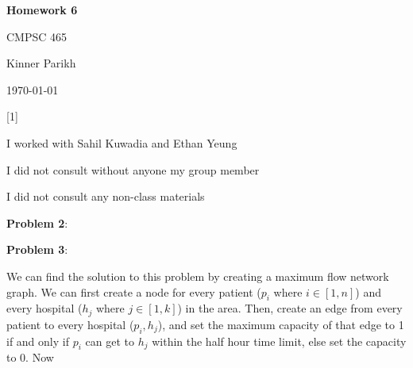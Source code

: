 \documentclass{article} %
\newcommand{\question}[2][]{\begin{flushleft}
        \textbf{Problem #1}: \textit{#2}

\end{flushleft}}
\newcommand{\maketitletwo}[2][]{\begin{center}
        \Large{\textbf{Homework #1}
            
            CMPSC 465} %
        \vspace{5pt}
        
        \normalsize{Kinner Parikh  %
        
        \today}        %
        \vspace{40pt}


        \newpage
        
\end{center}}
\begin{document}
    \maketitletwo[6]  %

    \question[1]{}
    \begin{center}
        
        I worked with Sahil Kuwadia and Ethan Yeung
    
        I did not consult without anyone my group member
    
        I did not consult any non-class materials
    \end{center}
    
    \newpage

    \question[2]{}

    \newpage

    \question[3]{}

    We can find the solution to this problem by creating a maximum flow network graph. We can first create a node for every patient ($p_i$ where $i \in [1,n]$) and every hospital ($h_j$ where $j \in [1,k]$) in the area. Then, create an edge from every patient to every hospital ($p_i, h_j$), and set the maximum capacity of that edge to 1 if and only if $p_i$ can get to $h_j$ within the half hour time limit, else set the capacity to 0. Now 

    
\end{document}
